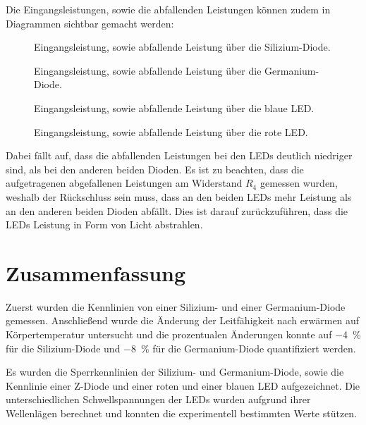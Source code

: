 \documentclass[
12pt,
a4paper,
bibliography=totocnumbered, %
BCOR=1cm, %
oneside, %
]{scrartcl}
\begin{document}
Die Eingangsleistungen, sowie die abfallenden Leistungen können zudem in Diagrammen sichtbar gemacht werden:
\begin{figure}[H]
	\caption{Eingangsleistung, sowie abfallende Leistung über die Silizium-Diode.}
	\label{fig:PSi}
\end{figure}
\begin{figure}[H]
	\caption{Eingangsleistung, sowie abfallende Leistung über die Germanium-Diode.}
	\label{fig:PGe}
\end{figure}
\begin{figure}[H]
	\caption{Eingangsleistung, sowie abfallende Leistung über die blaue LED.}
	\label{fig:PBl}
\end{figure}
\begin{figure}[H]
	\caption{Eingangsleistung, sowie abfallende Leistung über die rote LED.}
	\label{fig:PRo}
\end{figure}

Dabei fällt auf, dass die abfallenden Leistungen bei den LEDs deutlich niedriger sind, als bei den anderen beiden Dioden. Es ist zu beachten, dass die aufgetragenen abgefallenen Leistungen am Widerstand \(R_4\) gemessen wurden, weshalb der Rückschluss sein muss, dass an den beiden LEDs mehr Leistung als an den anderen beiden Dioden abfällt. Dies ist darauf zurückzuführen, dass die LEDs Leistung in Form von Licht abstrahlen.

\section{Zusammenfassung}

Zuerst wurden die Kennlinien von einer Silizium- und einer Germanium-Diode gemessen. Anschließend wurde die Änderung der Leitfähigkeit nach erwärmen auf Körpertemperatur untersucht und die prozentualen Änderungen konnte auf \qty{-4}{\percent} für die Silizium-Diode und \qty{-8}{\percent} für die Germanium-Diode quantifiziert werden.

Es wurden die Sperrkennlinien der Silizium- und Germanium-Diode, sowie die Kennlinie einer Z-Diode und einer roten und einer blauen LED aufgezeichnet. Die unterschiedlichen Schwellspannungen der LEDs wurden aufgrund ihrer Wellenlägen berechnet und konnten die experimentell bestimmten Werte stützen.
\end{document}
